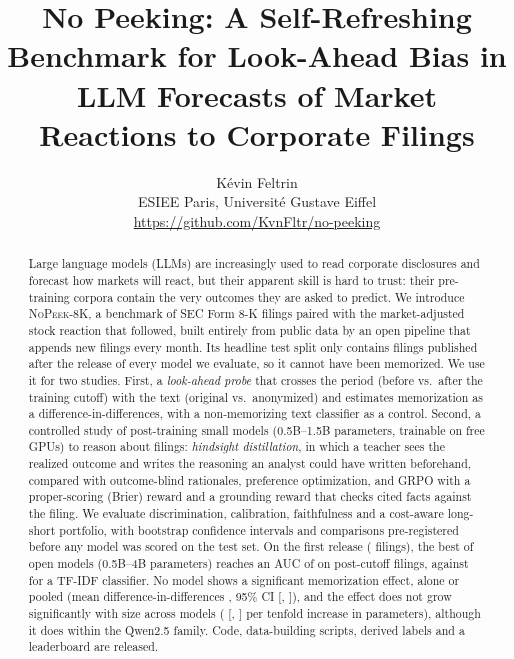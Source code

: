 \documentclass{article}
\title{No Peeking: A Self-Refreshing Benchmark for Look-Ahead Bias in LLM Forecasts of Market Reactions to Corporate Filings}
\author{K\'evin Feltrin\\
  ESIEE Paris, Universit\'e Gustave Eiffel\\
  \url{https://github.com/KvnFltr/no-peeking}}
\newcommand{\dataset}{\textsc{NoPeek-8K}}
\begin{document}
\maketitle

\begin{abstract}
Large language models (LLMs) are increasingly used to read corporate disclosures and forecast how markets will
react, but their apparent skill is hard to trust: their pre-training corpora contain the very outcomes they are
asked to predict. We introduce \dataset{}, a benchmark of SEC Form 8-K filings paired with the market-adjusted
stock reaction that followed, built entirely from public data by an open pipeline that appends new filings every
month. Its headline test split only contains filings published after the release of every model we evaluate, so it
cannot have been memorized. We use it for two studies. First, a \emph{look-ahead probe} that crosses the period
(before vs.\ after the training cutoff) with the text (original vs.\ anonymized) and estimates memorization as a
difference-in-differences, with a non-memorizing text classifier as a control. Second, a controlled study of
post-training small models (0.5B--1.5B parameters, trainable on free GPUs) to reason about filings:
\emph{hindsight distillation}, in which a teacher sees the realized outcome and writes the reasoning an analyst
could have written beforehand, compared with outcome-blind rationales, preference optimization, and GRPO with a
proper-scoring (Brier) reward and a grounding reward that checks cited facts against the filing. We evaluate
discrimination, calibration, faithfulness and a cost-aware long-short portfolio, with bootstrap confidence intervals
and comparisons pre-registered before any model was scored on the test set. On the first release
(\NFilings{} filings), the best of \ProbeNModels{} open models (0.5B--4B parameters) reaches an AUC of
\BestLLMTestPostAuc{} on post-cutoff filings, against \TfidfLrTestPostAuc{} for a TF-IDF classifier. No model shows a
significant memorization effect, alone or pooled (mean difference-in-differences \ScalingMeanDid{}, 95\% CI
[\ScalingMeanDidLo{}, \ScalingMeanDidHi{}]), and the effect does not grow significantly with size across models
(\ScalingSlopePerDecade{} [\ScalingSlopePerDecadeLo{}, \ScalingSlopePerDecadeHi{}] per tenfold increase in
parameters), although it does within the Qwen2.5 family. Code, data-building scripts, derived labels and a
leaderboard are released.
\end{abstract}
\end{document}
